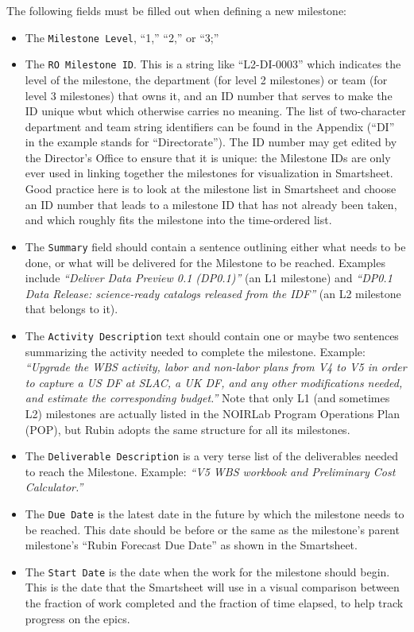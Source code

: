 The following fields must be filled out when defining a new milestone:
\begin{itemize}
\item The \texttt{Milestone Level}, ``1,'' ``2,'' or ``3;''
\item The \texttt{RO Milestone ID}.
  This is a string like ``L2-DI-0003'' which indicates the level of the milestone, the department (for level 2 milestones) or team (for level 3 milestones) that owns it, and an ID number that serves to make the ID unique wbut which otherwise carries no meaning.
  The list of two-character department and team string identifiers can be found in the Appendix (``DI'' in the example stands for ``Directorate'').
  The ID number may get edited by the Director's Office to ensure that it is unique: the Milestone IDs are only ever used in linking together the milestones for visualization in Smartsheet.
  Good practice here is to look at the milestone list in Smartsheet and choose an ID number that leads to a milestone ID that has not already been taken, and which roughly fits the milestone into the time-ordered list.
\item The \texttt{Summary} field should contain a sentence outlining either what needs to be done, or what will be delivered for the Milestone to be reached.
  Examples include \textit{``Deliver Data Preview 0.1 (DP0.1)''} (an L1 milestone) and \textit{``DP0.1 Data Release: science-ready catalogs released from the IDF''} (an L2 milestone that belongs to it).
\item The \texttt{Activity Description} text should contain one or maybe two sentences summarizing the activity needed to complete the milestone.
  Example: \textit{``Upgrade the WBS activity, labor and non-labor plans from V4 to V5 in order to capture a US DF at SLAC, a UK DF, and any other modifications needed, and estimate the corresponding budget.''}
  Note that only L1 (and sometimes L2) milestones are actually listed in the NOIRLab Program Operations Plan (POP), but Rubin adopts the same structure for all its milestones.
\item The \texttt{Deliverable Description} is a very terse list of the deliverables needed to reach the Milestone.
  Example: \textit{``V5 WBS workbook and Preliminary Cost Calculator.''}
\item The \texttt{Due Date} is the latest date in the future by which the milestone needs to be reached.
  This date should be before or the same as the milestone's parent milestone's ``Rubin Forecast Due Date'' as shown in the Smartsheet.
\item The \texttt{Start Date} is the date when the work for the milestone should begin.
  This is the date that the Smartsheet will use in a visual comparison between the fraction of work completed and the fraction of time elapsed, to help track progress on the epics.
\end{itemize}

